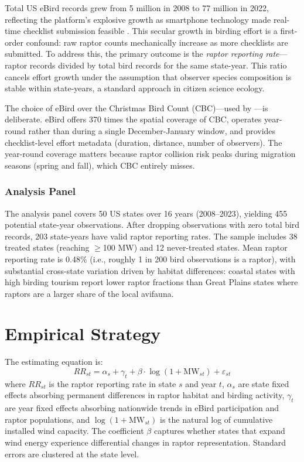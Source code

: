 \documentclass[12pt]{article}
\begin{document}
Total US eBird records grew from 5 million in 2008 to 77 million in 2022, reflecting the platform's explosive growth as smartphone technology made real-time checklist submission feasible \citep{johnston2014american}. This secular growth in birding effort is a first-order confound: raw raptor counts mechanically increase as more checklists are submitted. To address this, the primary outcome is the \textit{raptor reporting rate}---raptor records divided by total bird records for the same state-year. This ratio cancels effort growth under the assumption that observer species composition is stable within state-years, a standard approach in citizen science ecology.

The choice of eBird over the Christmas Bird Count (CBC)---used by \citet{katovich2024environmental}---is deliberate. eBird offers 370 times the spatial coverage of CBC, operates year-round rather than during a single December-January window, and provides checklist-level effort metadata (duration, distance, number of observers). The year-round coverage matters because raptor collision risk peaks during migration seasons (spring and fall), which CBC entirely misses.

\subsubsection*{Analysis Panel} The analysis panel covers 50 US states over 16 years (2008--2023), yielding 455 potential state-year observations. After dropping observations with zero total bird records, 203 state-years have valid raptor reporting rates. The sample includes 38 treated states (reaching $\geq$100 MW) and 12 never-treated states. Mean raptor reporting rate is 0.48\% (i.e., roughly 1 in 200 bird observations is a raptor), with substantial cross-state variation driven by habitat differences: coastal states with high birding tourism report lower raptor fractions than Great Plains states where raptors are a larger share of the local avifauna.

\section{Empirical Strategy}

The estimating equation is:
\begin{equation}
RR_{st} = \alpha_s + \gamma_t + \beta \cdot \log(1 + \text{MW}_{st}) + \varepsilon_{st}
\label{eq:main}
\end{equation}
where $RR_{st}$ is the raptor reporting rate in state $s$ and year $t$, $\alpha_s$ are state fixed effects absorbing permanent differences in raptor habitat and birding activity, $\gamma_t$ are year fixed effects absorbing nationwide trends in eBird participation and raptor populations, and $\log(1 + \text{MW}_{st})$ is the natural log of cumulative installed wind capacity. The coefficient $\beta$ captures whether states that expand wind energy experience differential changes in raptor representation. Standard errors are clustered at the state level.
\end{document}
